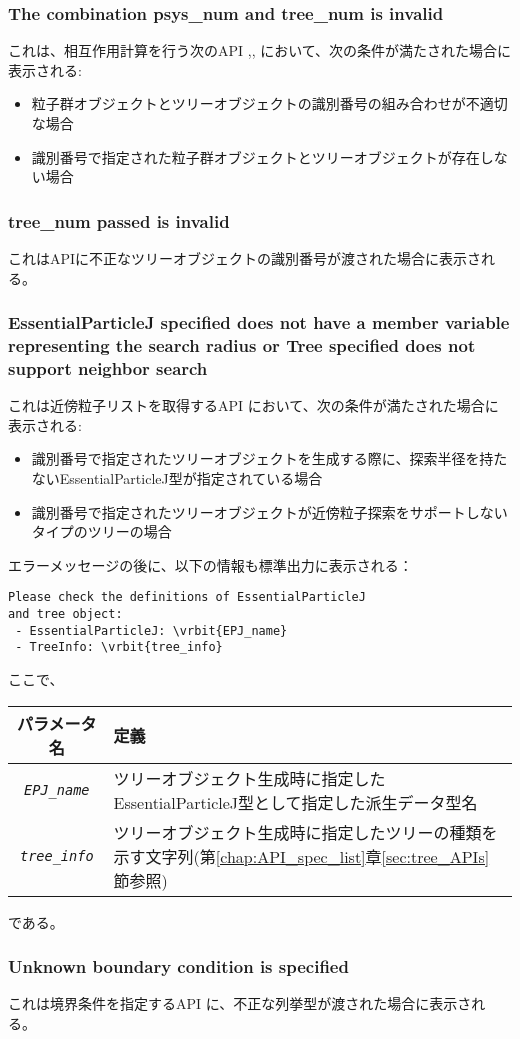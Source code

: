 \subsubsection{The combination psys\_num and tree\_num is invalid}
これは、相互作用計算を行う次のAPI ,, において、次の条件が満たされた場合に表示される:
\begin{itemize}[leftmargin=*,itemsep=-1ex]
\item 粒子群オブジェクトとツリーオブジェクトの識別番号の組み合わせが不適切な場合
\item 識別番号で指定された粒子群オブジェクトとツリーオブジェクトが存在しない場合
\end{itemize}

\subsubsection{tree\_num passed is invalid}
これはAPIに不正なツリーオブジェクトの識別番号が渡された場合に表示される。

\subsubsection{EssentialParticleJ specified does not have a member variable representing the search radius or Tree specified does not support neighbor search}
これは近傍粒子リストを取得するAPI  において、次の条件が満たされた場合に表示される:
\begin{itemize}[leftmargin=*,itemsep=-1ex]
\item 識別番号で指定されたツリーオブジェクトを生成する際に、探索半径を持たないEssentialParticleJ型が指定されている場合
\item 識別番号で指定されたツリーオブジェクトが近傍粒子探索をサポートしないタイプのツリーの場合
\end{itemize}
エラーメッセージの後に、以下の情報も標準出力に表示される：
\begin{screen}
\begin{Verbatim}[commandchars=\\\{\}]
Please check the definitions of EssentialParticleJ
and tree object:
 - EssentialParticleJ: \vrbit{EPJ_name}
 - TreeInfo: \vrbit{tree_info}
\end{Verbatim}
\end{screen}
ここで、
\begin{table}[H]
\begin{tabularx}{\linewidth}{|c|X|}
\toprule
\rowcolor{Snow2}
パラメータ名 & 定義 \\
\midrule
\textit{\texttt{EPJ\_name}} & ツリーオブジェクト生成時に指定したEssentialParticleJ型として指定した派生データ型名 \\
\textit{\texttt{tree\_info}} & ツリーオブジェクト生成時に指定したツリーの種類を示す文字列(第\ref{chap:API_spec_list}章\ref{sec:tree_APIs}節参照) \\
\bottomrule
\end{tabularx}
\end{table}
である。

\subsubsection{Unknown boundary condition is specified}
これは境界条件を指定するAPI  に、不正な列挙型が渡された場合に表示される。
